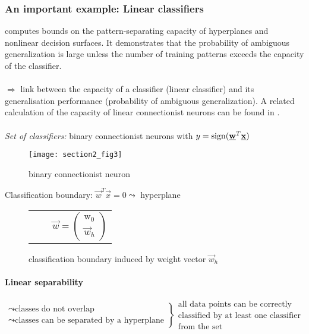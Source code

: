 \subsubsection{An important example: Linear classifiers}
\textcite{Cover1965} computes bounds on the pattern-separating
capacity of hyperplanes and nonlinear decision surfaces. It
demonstrates that the probability of ambiguous generalization is large
unless the number of
training patterns exceeds the capacity of the classifier.\\\\
$\Rightarrow$ link between the capacity of a classifier (linear
classifier) and its generalisation performance (probability of
ambiguous generalization).  A related calculation of the capacity
of linear connectionist neurons can be found in \parencite[ch.~40.3]{MacKay2003}. 
\\\\
\emph{Set of classifiers:} binary connectionist neurons with 
$y = \operatorname{sign} (\underline{\mathbf{w}}^T \underline{\mathbf{x}})$
\begin{figure}[h]
  \centering
 \texttt{[image: section2\_fig3]}  
  \caption{binary connectionist neuron}
\end{figure}


Classification boundary: $\vec{w}^T \vec{x} = 0 \leadsto$ hyperplane
\begin{figure}[h]
  \centering
  \begin{tabular}[h]{c c c}
	\raisebox{-2.5cm}{\texttt{[image: section2\_fig4]}}
	& \rule{5mm}{0pt}&$\vec{w} = \left(
          \begin{array}{c}
          \mathrm{w}_0 \\ \vec{w}_h
          \end{array}
          \right)
$
  \end{tabular}
  \caption{classification boundary induced by weight vector $\vec{w}_h$}
\end{figure}



\paragraph{Linear separability}
\[ \left. \begin{array}{l}
	\leadsto \text{classes do not overlap} \\
	\leadsto \text{classes can be separated by a hyperplane}
\end{array} \right \} \substack{ \text{all data points can be correctly} \\
				\text{classified by at least one classifier} \\
				\text{from the set} } \]

